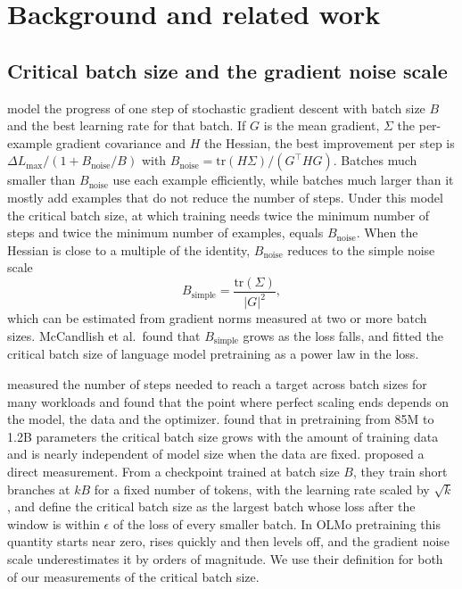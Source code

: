 \documentclass[10pt]{article}
\newcommand{\bsimple}{B_{\mathrm{simple}}}
\newcommand{\bnoise}{B_{\mathrm{noise}}}
\begin{document}
\section{Background and related work}\label{sec:related}

\subsection{Critical batch size and the gradient noise scale}

\citet{mccandlish2018} model the progress of one step of stochastic gradient descent with batch size $B$ and the best learning rate for that batch. If $G$ is the mean gradient, $\Sigma$ the per-example gradient covariance and $H$ the Hessian, the best improvement per step is $\Delta L_{\max}/(1 + \bnoise/B)$ with $\bnoise = \mathrm{tr}(H\Sigma)/(G^{\top}HG)$. Batches much smaller than $\bnoise$ use each example efficiently, while batches much larger than it mostly add examples that do not reduce the number of steps. Under this model the critical batch size, at which training needs twice the minimum number of steps and twice the minimum number of examples, equals $\bnoise$. When the Hessian is close to a multiple of the identity, $\bnoise$ reduces to the simple noise scale
\begin{equation}
\bsimple = \frac{\mathrm{tr}(\Sigma)}{|G|^2},
\end{equation}
which can be estimated from gradient norms measured at two or more batch sizes. McCandlish et al.\ found that $\bsimple$ grows as the loss falls, and \citet{kaplan2020} fitted the critical batch size of language model pretraining as a power law in the loss.

\citet{shallue2019} measured the number of steps needed to reach a target across batch sizes for many workloads and found that the point where perfect scaling ends depends on the model, the data and the optimizer. \citet{zhang2025cbs} found that in pretraining from 85M to 1.2B parameters the critical batch size grows with the amount of training data and is nearly independent of model size when the data are fixed. \citet{merrill2025} proposed a direct measurement. From a checkpoint trained at batch size $B$, they train short branches at $kB$ for a fixed number of tokens, with the learning rate scaled by $\sqrt{k}$, and define the critical batch size as the largest batch whose loss after the window is within $\epsilon$ of the loss of every smaller batch. In OLMo pretraining this quantity starts near zero, rises quickly and then levels off, and the gradient noise scale underestimates it by orders of magnitude. We use their definition for both of our measurements of the critical batch size.
\end{document}
